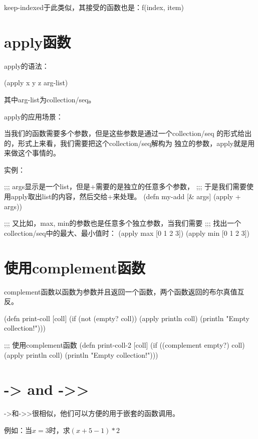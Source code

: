 ﻿\documentclass[a4paper,11pt]{article}
\begin{document}
  keep-indexed于此类似，其接受的函数也是：f(index, item)


  \section[function apply]{apply函数}
  apply的语法：

  \begin{schemecode}
    (apply x y z arg-list)
  \end{schemecode}

  其中arg-list为collection/seq。

  apply的应用场景：

  当我们的函数需要多个参数，但是这些参数是通过一个collection/seq
  的形式给出的，形式上来看，我们需要把这个collection/seq解构为
  独立的参数，apply就是用来做这个事情的。

  实例：

  \begin{schemecode}
    ;;; args显示是一个list，但是+需要的是独立的任意多个参数，
    ;;; 于是我们需要使用apply取出list的内容，然后交给+来处理。
    (defn my-add
      [& args]
      (apply + args))

    ;;; 又比如，max, min的参数也是任意多个独立参数，当我们需要
    ;;; 找出一个collection/seq中的最大、最小值时：
    (apply max [0 1 2 3])
    (apply min [0 1 2 3])
  \end{schemecode}


  \section[使用complement函数]{使用complement函数}
  complement函数以函数为参数并且返回一个函数，两个函数返回的布尔真值互反。
  
  \begin{schemecode}
(defn print-coll
  [coll]
  (if (not (empty? coll))
    (apply println coll)
    (println "Empty collection!")))

;;; 使用complement函数
(defn print-coll-2
  [coll]
  (if ((complement empty?) coll)
    (apply println coll)
    (println "Empty collection!")))
  \end{schemecode}


  \section[-> and ->>]{-> and ->>}
  ->和->>很相似，他们可以方便的用于嵌套的函数调用。

  例如：当$x=3$时，求$(x+5-1)*2$
\end{document}
